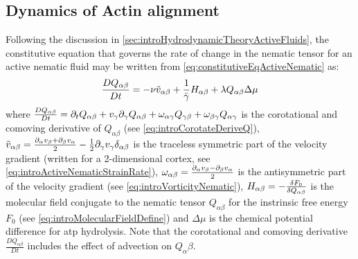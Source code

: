 \subsection{Dynamics of Actin alignment}\label{subsec:actinAlignmentModelAC}
Following the discussion in \autoref{sec:introHydrodynamicTheoryActiveFluids}, the constitutive equation that governs the rate of change in the nematic tensor for an active nematic fluid may be written from \autoref{eq:constitutiveEqActiveNematic} as:
\begin{equation}\label{eq:nematicDynamicsGeneralModelAC}
    \frac{DQ_{\alpha\beta}}{Dt} = -\nu \Tilde{v}_{\alpha\beta} + \frac{1}{\bar{\gamma}}H_{\alpha\beta} + \lambda Q_{\alpha\beta}\Delta\mu
\end{equation}
where $\frac{DQ_{\alpha\beta}}{Dt} = \inlinePartial{t}{Q_{\alpha\beta}} + v_\gamma\inlinePartial{\gamma}{Q_{\alpha\beta}} + \omega_{\alpha\gamma}Q_{\gamma\beta} + \omega_{\beta\gamma}Q_{\alpha\gamma}$ is the corotational and comoving derivative of $Q_{\alpha\beta}$ (see \autoref{eq:introCorotateDeriveQ}), $\Tilde{v}_{\alpha\beta} = \frac{\inlinePartial{\alpha}{v_\beta} + \inlinePartial{\beta}{v_\alpha}}{2} - \frac{1}{2}\inlinePartial{\gamma}{v_\gamma}\delta_{\alpha\beta}$ is the traceless symmetric part of the velocity gradient (written for a 2-dimensional cortex, see \autoref{eq:introActiveNematicStrainRate}), $\omega_{\alpha\beta} = \frac{\inlinePartial{\alpha}{v_\beta} - \inlinePartial{\beta}{v_\alpha}}{2}$ is the antisymmetric part of the velocity gradient (see \autoref{eq:introVorticityNematic}), $H_{\alpha\beta} = -\fdv{F_0}{Q_{\alpha\beta}}$ is the molecular field conjugate to the nematic tensor $Q_{\alpha\beta}$ for the instrinsic free energy $F_0$ (see \autoref{eq:introMolecularFieldDefine}) and $\Delta\mu$ is the chemical potential difference for \ac{atp} hydrolysis. Note that the corotational and comoving derivative $\frac{DQ_{\alpha\beta}}{Dt}$ includes the effect of advection on $Q_{\alpha}{\beta}$.

